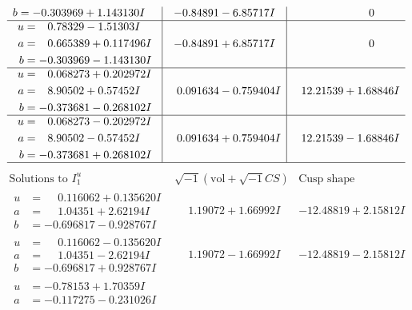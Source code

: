 \documentclass[1p]{elsarticle_modified}
\theoremstyle{definition}
\newcommand{\I}{\sqrt{-1}}
\begin{document}
$$\begin{array}{c|c|c}
\begin{aligned}
b &= -0.303969 + 1.143130 I\end{aligned}
 & -0.84891 - 6.85717 I & \phantom{-0.000000 } 0 \\ \hline\begin{aligned}
u &= \phantom{-}0.78329 - 1.51303 I \\
a &= \phantom{-}0.665389 + 0.117496 I \\
b &= -0.303969 - 1.143130 I\end{aligned}
 & -0.84891 + 6.85717 I & \phantom{-0.000000 } 0 \\ \hline\begin{aligned}
u &= \phantom{-}0.068273 + 0.202972 I \\
a &= \phantom{-}8.90502 + 0.57452 I \\
b &= -0.373681 - 0.268102 I\end{aligned}
 & \phantom{-}0.091634 - 0.759404 I & \phantom{-}12.21539 + 1.68846 I \\ \hline\begin{aligned}
u &= \phantom{-}0.068273 - 0.202972 I \\
a &= \phantom{-}8.90502 - 0.57452 I \\
b &= -0.373681 + 0.268102 I\end{aligned}
 & \phantom{-}0.091634 + 0.759404 I & \phantom{-}12.21539 - 1.68846 I\\
 \hline 
 \end{array}$$\newpage$$\begin{array}{c|c|c}  
\text{Solutions to }I^u_{1}& \I (\text{vol} + \sqrt{-1}CS) & \text{Cusp shape}\\
 \hline 
\begin{aligned}
u &= \phantom{-}0.116062 + 0.135620 I \\
a &= \phantom{-}1.04351 + 2.62194 I \\
b &= -0.696817 - 0.928767 I\end{aligned}
 & \phantom{-}1.19072 + 1.66992 I & -12.48819 + 2.15812 I \\ \hline\begin{aligned}
u &= \phantom{-}0.116062 - 0.135620 I \\
a &= \phantom{-}1.04351 - 2.62194 I \\
b &= -0.696817 + 0.928767 I\end{aligned}
 & \phantom{-}1.19072 - 1.66992 I & -12.48819 - 2.15812 I \\ \hline\begin{aligned}
u &= -0.78153 + 1.70359 I \\
a &= -0.117275 - 0.231026 I \\

\end{aligned}
\end{array}$$
\end{document}

